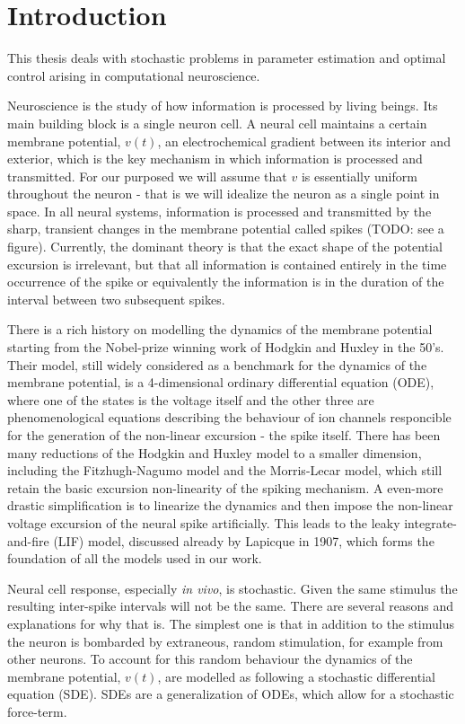\documentclass{report}
\begin{document}
\pagestyle{headings} 


\chapter{Introduction}
This thesis deals with stochastic problems in parameter estimation and
optimal control arising in computational neuroscience. 

Neuroscience is the study of how information is processed by living beings. Its
main building block is a single neuron cell. A neural cell maintains a certain
membrane potential, $v(t)$, an electrochemical gradient between its interior and
exterior, which is the key mechanism in which information is processed and
transmitted. For our purposed we will assume that $v$ is essentially uniform
throughout the neuron - that is we will idealize the neuron as a single point in
space. In all neural systems, information is processed and transmitted by the
sharp, transient changes in the membrane potential called spikes (TODO: see a
figure). Currently, the dominant theory is that the exact shape of the potential
excursion is irrelevant, but that all information is contained entirely in the
time occurrence of the spike or equivalently the information is in
the duration of the interval between two subsequent spikes.

There is a rich history on modelling the dynamics of the membrane potential
starting from the Nobel-prize winning work of Hodgkin and Huxley in the 50's.
Their model, still widely considered as a benchmark for the dynamics of the
membrane potential, is a 4-dimensional ordinary differential equation (ODE),
where one of the states is the voltage itself and the other three are phenomenological
equations describing the behaviour of ion channels responcible for the
generation of the non-linear excursion - the spike itself. There has been many
reductions of the Hodgkin and Huxley model to a smaller dimension, including the
Fitzhugh-Nagumo model and the Morris-Lecar model, which still retain the basic
excursion non-linearity of the spiking mechanism. A even-more drastic
simplification is to linearize the dynamics and then impose the non-linear
voltage excursion of the neural spike artificially. This leads to the leaky
integrate-and-fire (LIF) model, discussed already by Lapicque in 1907, which
forms the foundation of all the models used in our work.

Neural cell response, especially {\sl in vivo}, is stochastic. Given the same
stimulus the resulting inter-spike intervals will not be the same. There are
several reasons and explanations for why that is. The simplest one is that in
addition to the stimulus the neuron is bombarded by extraneous, random
stimulation, for example from other neurons. To account for this random
behaviour the dynamics of the membrane potential, $v(t)$, are modelled as
following a stochastic differential equation (SDE). SDEs are a generalization
of ODEs, which allow for a stochastic force-term. 
\end{document}
